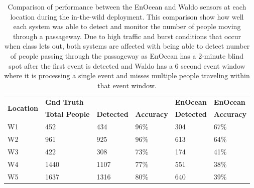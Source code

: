 \begin{table}[t]
\footnotesize
	\begin{tabular}{@{}p{1.0in}p{0.9in}p{0.8in}p{0.7in}p{0.7in}p{0.5in}@{}}
	\toprule
	\multirow{2}{*}{\textbf{Location}}	&	\textbf{Gnd Truth} & \textbf{\sysname} & \textbf{\sysname} & \textbf{EnOcean} 	& \textbf{EnOcean}	\\
	& \textbf{Total People} & \textbf{Detected} & \textbf{Accuracy} &  \textbf{Detected} & \textbf{Accuracy} \\\midrule
	W1 & 452 & 434 & 96\% & 304 & 67\% \\ %
	W2 & 961 & 925 & 96\% & 613 & 64\% \\ %
	W3 & 422 & 308 & 73\% & 174 & 41\% \\	%
        W4 & 1440 & 1107 & 77\% & 551 & 38\% \\ %
	W5 & 1637 & 1316 & 80\% & 640 & 39\% \\ %
	\bottomrule
	\end{tabular}
	\caption{Comparison of performance between the EnOcean and Waldo sensors at each location during the in-the-wild deployment.  This comparison show how well each system was able to detect and monitor the number of people moving through a passageway.  Due to high traffic and burst conditions that occur when class lets out, both systems are affected with being able to detect number of people passing through the passageway as EnOcean has a 2-minute blind spot after the first event is detected and Waldo has a 6 second event window where it is processing a single event and misses multiple people traveling within that event window.
	\vspace{1mm}
	\label{tab:ITWEnOceanVWaldoresults}}

\end{table}






